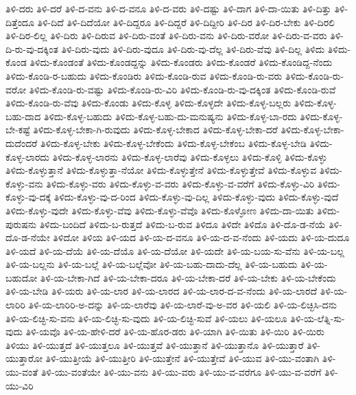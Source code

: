 {ತಿಳಿ-ದರು
ತಿಳಿ-ದರೆ
ತಿಳಿ-ದ-ವನು
ತಿಳಿ-ದ-ವನೂ
ತಿಳಿ-ದ-ವರು
ತಿಳಿ-ದಷ್ಟು
ತಿಳಿ-ದಾಗ
ತಿಳಿ-ದಾ-ಯಿತು
ತಿಳಿ-ದಿತ್ತು
ತಿಳಿ-ದಿತ್ತೆಂದೂ
ತಿಳಿ-ದಿದೆ
ತಿಳಿ-ದಿದೆಯೋ
ತಿಳಿ-ದಿದ್ದರೂ
ತಿಳಿ-ದಿದ್ದರೆ
ತಿಳಿ-ದಿದ್ದೀರಿ
ತಿಳಿ-ದಿರ
ತಿಳಿ-ದಿರ-ಬೇಕು
ತಿಳಿ-ದಿರಲಿ
ತಿಳಿ-ದಿರ-ಲಿಲ್ಲ
ತಿಳಿ-ದಿರು
ತಿಳಿ-ದಿರುವ
ತಿಳಿ-ದಿರು-ವಂತೆ
ತಿಳಿ-ದಿರು-ವನು
ತಿಳಿ-ದಿರು-ವರೋ
ತಿಳಿ-ದಿರು-ವ-ವರು
ತಿಳಿ-ದಿ-ರು-ವು-ದಕ್ಕಿಂತ
ತಿಳಿ-ದಿರು-ವುದು
ತಿಳಿ-ದಿರು-ವುದೂ
ತಿಳಿ-ದಿರು-ವು-ದೆಲ್ಲ
ತಿಳಿ-ದಿರು-ವೆವು
ತಿಳಿ-ದಿಲ್ಲ
ತಿಳಿದು
ತಿಳಿದು-ಕೊಂಡ
ತಿಳಿದು-ಕೊಂಡಂತೆ
ತಿಳಿದು-ಕೊಂಡದ್ದನ್ನು
ತಿಳಿದು-ಕೊಂಡರು
ತಿಳಿದು-ಕೊಂಡರೆ
ತಿಳಿದು-ಕೊಂಡಿದ್ದ-ನೆಂದು
ತಿಳಿದು-ಕೊಂಡಿ-ರ-ಬಹುದು
ತಿಳಿದು-ಕೊಂಡಿರು
ತಿಳಿದು-ಕೊಂಡಿ-ರುವ
ತಿಳಿದು-ಕೊಂಡಿ-ರು-ವರು
ತಿಳಿದು-ಕೊಂಡಿ-ರು-ವರೋ
ತಿಳಿದು-ಕೊಂಡಿ-ರು-ವಷ್ಟು
ತಿಳಿದು-ಕೊಂಡಿ-ರು-ವಿರಿ
ತಿಳಿದು-ಕೊಂಡಿ-ರು-ವು-ದಕ್ಕಿಂತ
ತಿಳಿದು-ಕೊಂಡಿ-ರುವೆ
ತಿಳಿದು-ಕೊಂಡಿ-ರು-ವೆವು
ತಿಳಿದು-ಕೊಂಡು
ತಿಳಿದು-ಕೊಳ್ಳ
ತಿಳಿದು-ಕೊಳ್ಳದೇ
ತಿಳಿದು-ಕೊಳ್ಳ-ಬಲ್ಲರು
ತಿಳಿದು-ಕೊಳ್ಳ-ಬಹು-ದಾದ
ತಿಳಿದು-ಕೊಳ್ಳ-ಬಹುದು
ತಿಳಿದು-ಕೊಳ್ಳ-ಬಹು-ದು-ಮನುಷ್ಯನು
ತಿಳಿದು-ಕೊಳ್ಳ-ಬಾ-ರದು
ತಿಳಿದು-ಕೊಳ್ಳ-ಬೇ-ಕಷ್ಟೆ
ತಿಳಿದು-ಕೊಳ್ಳ-ಬೇಕಾ-ಗಿ-ರುವುದು
ತಿಳಿದು-ಕೊಳ್ಳ-ಬೇಕಾದ
ತಿಳಿದು-ಕೊಳ್ಳ-ಬೇಕಾ-ದರೆ
ತಿಳಿದು-ಕೊಳ್ಳ-ಬೇಕಾ-ದುದೆಂದರೆ
ತಿಳಿದು-ಕೊಳ್ಳ-ಬೇಕು
ತಿಳಿದು-ಕೊಳ್ಳ-ಬೇಕೆಂದು
ತಿಳಿದು-ಕೊಳ್ಳ-ಬೇಕೆಂಬ
ತಿಳಿದು-ಕೊಳ್ಳ-ಬೇಡಿ
ತಿಳಿದು-ಕೊಳ್ಳ-ಲಾರದು
ತಿಳಿದು-ಕೊಳ್ಳ-ಲಾರನು
ತಿಳಿದು-ಕೊಳ್ಳ-ಲಾರೆವು
ತಿಳಿದು-ಕೊಳ್ಳಲು
ತಿಳಿದು-ಕೊಳ್ಳಿ
ತಿಳಿದು-ಕೊಳ್ಳು
ತಿಳಿದು-ಕೊಳ್ಳುತ್ತಾನೆ
ತಿಳಿದು-ಕೊಳ್ಳುತ್ತಾ-ನೆಯೋ
ತಿಳಿದು-ಕೊಳ್ಳುತ್ತೇನೆ
ತಿಳಿದು-ಕೊಳ್ಳುತ್ತೇವೆ
ತಿಳಿದು-ಕೊಳ್ಳುವ
ತಿಳಿದು-ಕೊಳ್ಳು-ವನು
ತಿಳಿದು-ಕೊಳ್ಳು-ವರು
ತಿಳಿದು-ಕೊಳ್ಳು-ವ-ವರು
ತಿಳಿದು-ಕೊಳ್ಳು-ವ-ವರೆಗೆ
ತಿಳಿದು-ಕೊಳ್ಳು-ವಿರಿ
ತಿಳಿದು-ಕೊಳ್ಳು-ವು-ದಕ್ಕೆ
ತಿಳಿದು-ಕೊಳ್ಳು-ವು-ದ-ರಿಂದ
ತಿಳಿದು-ಕೊಳ್ಳು-ವು-ದಿಲ್ಲ
ತಿಳಿದು-ಕೊಳ್ಳು-ವುದು
ತಿಳಿದು-ಕೊಳ್ಳು-ವುದೆ
ತಿಳಿದು-ಕೊಳ್ಳು-ವುದೇ
ತಿಳಿದು-ಕೊಳ್ಳು-ವೆವು
ತಿಳಿದು-ಕೊಳ್ಳು-ವೆವೊ
ತಿಳಿದು-ಕೊಳ್ಳೋಣ
ತಿಳಿದು-ದಾ-ಯಿತು
ತಿಳಿದು-ಪುರುಷನು
ತಿಳಿದು-ಬಂದಿದೆ
ತಿಳಿದು-ಬ-ರುತ್ತದೆ
ತಿಳಿದು-ಬ-ರುವ
ತಿಳಿದೂ
ತಿಳಿದೇ
ತಿಳಿದೊ
ತಿಳಿ-ದೊ-ಡ-ನೆಯೆ
ತಿಳಿ-ದೊ-ಡ-ನೆಯೇ
ತಿಳಿದೋ
ತಿಳಿಯ
ತಿಳಿ-ಯದ
ತಿಳಿ-ಯ-ದ-ವನೂ
ತಿಳಿ-ಯ-ದ-ವ-ನೆಂದು
ತಿಳಿ-ಯದು
ತಿಳಿ-ಯ-ದುದೂ
ತಿಳಿ-ಯದೆ
ತಿಳಿ-ಯ-ದೆಯೆ
ತಿಳಿ-ಯ-ದೆಯೊ
ತಿಳಿ-ಯ-ದೆಯೋ
ತಿಳಿ-ಯದೇ
ತಿಳಿ-ಯ-ಬಯ-ಸು-ವೆನು
ತಿಳಿ-ಯ-ಬಲ್ಲ
ತಿಳಿ-ಯ-ಬಲ್ಲನು
ತಿಳಿ-ಯ-ಬಲ್ಲೆ
ತಿಳಿ-ಯ-ಬಲ್ಲೆವೋ
ತಿಳಿ-ಯ-ಬಹು-ದಾದು-ದೆಲ್ಲ
ತಿಳಿ-ಯ-ಬಹುದು
ತಿಳಿ-ಯ-ಬಹುದೋ
ತಿಳಿ-ಯ-ಬೇಕಾ-ಗಿದೆ
ತಿಳಿ-ಯ-ಬೇಕಾ-ದರೂ
ತಿಳಿ-ಯ-ಬೇಕಾ-ದರೆ
ತಿಳಿ-ಯ-ಬೇಕು
ತಿಳಿ-ಯ-ಬೇಕೆಂದು
ತಿಳಿ-ಯ-ಬೇಡಿ
ತಿಳಿ-ಯರು
ತಿಳಿ-ಯ-ಲಾರ
ತಿಳಿ-ಯ-ಲಾರದ
ತಿಳಿ-ಯ-ಲಾರ-ದ-ವ-ನೆಂದು
ತಿಳಿ-ಯ-ಲಾರದೆ
ತಿಳಿ-ಯ-ಲಾರಿರಿ
ತಿಳಿ-ಯ-ಲಾರಿರಿ-ಅ-ದನ್ನು
ತಿಳಿ-ಯ-ಲಾರೆವು
ತಿಳಿ-ಯ-ಲಾರೆ-ವು-ಅ-ವರ
ತಿಳಿ-ಯಲಿ
ತಿಳಿ-ಯ-ಲಿಚ್ಛಿಸಿ-ದನು
ತಿಳಿ-ಯ-ಲಿಚ್ಛಿ-ಸು-ವನು
ತಿಳಿ-ಯ-ಲಿಚ್ಛಿ-ಸು-ವುದು
ತಿಳಿ-ಯ-ಲಿಚ್ಛಿ-ಸುವೆ
ತಿಳಿ-ಯಲು
ತಿಳಿ-ಯಲೂ
ತಿಳಿ-ಯ-ಲೆತ್ನಿ-ಸು-ವುದು
ತಿಳಿ-ಯವೊ
ತಿಳಿ-ಯ-ಹೇಳಿ-ದರೆ
ತಿಳಿ-ಯ-ಹೊರ-ಡರು
ತಿಳಿ-ಯಾಗಿ
ತಿಳಿ-ಯಿತು
ತಿಳಿ-ಯಿರಿ
ತಿಳಿ-ಯಿರು
ತಿಳಿಯು
ತಿಳಿ-ಯುತ್ತದೆ
ತಿಳಿ-ಯುತ್ತಲೂ
ತಿಳಿ-ಯುತ್ತವೆ
ತಿಳಿ-ಯುತ್ತಾನೆ
ತಿಳಿ-ಯುತ್ತಾನೊ
ತಿಳಿ-ಯುತ್ತಾರೆ
ತಿಳಿ-ಯುತ್ತಾರೋ
ತಿಳಿ-ಯುತ್ತೀಯೆ
ತಿಳಿ-ಯುತ್ತೀರಿ
ತಿಳಿ-ಯುತ್ತೇನೆ
ತಿಳಿ-ಯುತ್ತೇವೆ
ತಿಳಿ-ಯುವ
ತಿಳಿ-ಯು-ವಂತಾಗಿ
ತಿಳಿ-ಯು-ವಂತೆ
ತಿಳಿ-ಯು-ವಂತೆಯೇ
ತಿಳಿ-ಯು-ವನು
ತಿಳಿ-ಯು-ವರು
ತಿಳಿ-ಯು-ವ-ವರೆಗೂ
ತಿಳಿ-ಯು-ವ-ವರೆಗೆ
ತಿಳಿ-ಯು-ವಿರಿ
}
